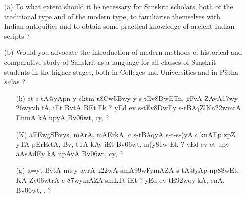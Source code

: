 {\begin{itemize}
\begin{itemize}
           \item[(a)] To what extent should it be necessary for Sanskrit scholars, both of the traditional type and of the modern type, to familiarise themselves with Indian antiquities and to obtain some practical knowledge of ancient Indian scripts ?
           
           \item[(b)] Would you advocate the introduction of modern methods of historical and comparative study of Sanskrit as a language for all classes of Sanskrit students in the higher stages, both in Colleges and Universities and in P$\bar{a}$tha$\acute{s}\bar{a}$l$\bar{a}$s ?
           
           \end{itemize}
\end{itemize}
}

\begin{itemize}  
 \item[{\dn \dnnum \rn{22}}] \begin{itemize}
               
               \item[({\dn k})] {\dn et s\2-tA@yApn-y ektm u\38Cw\?\35Bwy y s\2-tEv\38DwET\0n, gFvA\0\- ZAvA\317wy\2 \326wyvh fA, iEt BvtA\2 BEt Ek {\rs ?\re} yEd ev s\2-tEv\38DwEy\0 s\2-tBAqZl\?Kn\322wmtA\2 EnmA\0\2 kA upyA Bv\306wt, cy\?, {\rs ?\re}}
               
               \item[({\dn K})] {\dn a\3FEwgSBvys, mArA, mAErkA, c s\2-tBAqyA s\2-t{\rs -\re}s\2-(yA c k\?nAEp zp\?Z yTA pErEctA, Bv\?, tTA kAy\0 iEt Bv\306wt, m(y\381w\? Ek {\rs ?\re} yEd ev et up\?y aAsAdEy\2 kA upAyA Bv\306wt, cy\?, {\rs ?\re}}
               
               \item[({\dn g})] {\dn a=y\?t BvtA\2 mt y avrA k\322wA smA\399wFymAZA s\2-tA@yAp\- np\388wEt, KA Zv\306wtrA c \387wymAZA smLT\4t iEt {\rs ?\re} yEd ev tE\392wqy\? kA, cnA, Bv\306wt, \0, {\rs ?\re}}
 
                \end{itemize}      
                                                                
\end{itemize}

